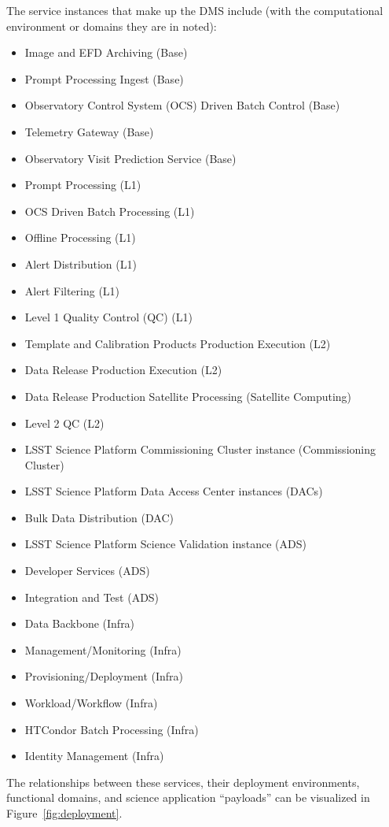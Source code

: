\documentclass[DM,toc]{lsstdoc}
\begin{document}
The service instances that make up the DMS include (with the
computational environment or domains they are in noted):
\begin{itemize}
\item
  Image and EFD Archiving (Base)
\item
  Prompt Processing Ingest (Base)
\item
  Observatory Control System (OCS) Driven Batch Control (Base)
\item
  Telemetry Gateway (Base)
\item
  Observatory Visit Prediction Service (Base)
\item
  Prompt Processing (L1)
\item
  OCS Driven Batch Processing (L1)
\item
  Offline Processing (L1)
\item
  Alert Distribution (L1)
\item
  Alert Filtering (L1)
\item
  Level 1 Quality Control (QC) (L1)
\item
  Template and Calibration Products Production Execution (L2)
\item
  Data Release Production Execution (L2)
\item
  Data Release Production Satellite Processing (Satellite Computing)
\item
  Level 2 QC (L2)
\item
  LSST Science Platform Commissioning Cluster instance (Commissioning
  Cluster)
\item
  LSST Science Platform Data Access Center instances (DACs)
\item
  Bulk Data Distribution (DAC)
\item
  LSST Science Platform Science Validation instance (ADS)
\item
  Developer Services (ADS)
\item
  Integration and Test (ADS)
\item
  Data Backbone (Infra)
\item
  Management/Monitoring (Infra)
\item
  Provisioning/Deployment (Infra)
\item
  Workload/Workflow (Infra)
\item
  HTCondor Batch Processing (Infra)
\item
  Identity Management (Infra)
\end{itemize}

The relationships between these services, their deployment environments,
functional domains, and science application ``payloads'' can be
visualized in Figure~\ref{fig:deployment}.
\end{document}

